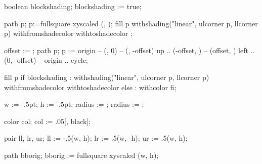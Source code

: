 


\startmodule [slide-mp]

\unprotect


	boolean blockshading; blockshading := true;
\stopMPdefinitions

	path p; p:=fullsquare xyscaled (\overlaywidth, \overlayheight);
	fill p
		withshading("linear", ulcorner p, llcorner p)
		withfromshadecolor \MPcolor{\overlaycolor}
		withtoshadecolor   ;
\stopuseMPgraphic

	offset := ;
	path p; p :=
		origin                                      -- (\overlaywidth, 0)                     --
		(\overlaywidth, \overlayheight-offset) {up} .. (\overlaywidth-offset, \overlayheight) --
		(offset, \overlayheight) {left}             .. (0, \overlayheight-offset)             --
		origin                                      .. cycle;

	fill p
		if blockshading :
			withshading("linear", ulcorner p, llcorner p)
			withfromshadecolor \MPcolor{\overlaycolor}
			withtoshadecolor   
		else :
			withcolor \MPcolor{\overlaycolor}
		fi;
\stopuseMPgraphic

	w      := \overlaywidth-.5pt;
	h      := \overlayheight-.5pt;
	radius := ;
	radius := ;

	color col;
	col := .05[, black];

	pair ll, lr, ur;
	ll := -.5(w,  h);
	lr :=  .5(w, -h);
	ur :=  .5(w,  h);

	path bborig;
	bborig := fullsquare xyscaled (w, h);

